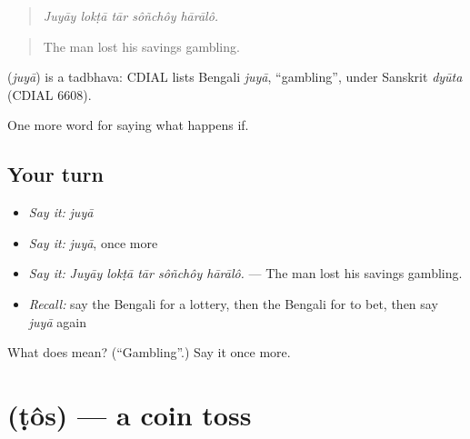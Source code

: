 \begin{quote}
    
\end{quote}

\begin{quote}
\emph{Juyāy lokṭā tār sôñchôy hārālô.}
\end{quote}

\begin{quote}
The man lost his savings gambling.
\end{quote}

\begin{cousinweb}
\textbf{} (\emph{juyā}) is a tadbhava: CDIAL lists Bengali \emph{juyā}, \textquotedblleft{}gambling\textquotedblright{}, under Sanskrit \emph{dyūta} (CDIAL 6608).
\end{cousinweb}

\begin{grammarlens}[title={What you've built}]
One more word for saying what happens if.
\end{grammarlens}

\subsection*{Your turn}
\begin{itemize}
\raggedright
  \item \emph{Say it:} \emph{juyā}
  \item \emph{Say it:} \emph{juyā}, once more
  \item \emph{Say it:} \emph{Juyāy lokṭā tār sôñchôy hārālô.} — The man lost his savings gambling.
  \item \emph{Recall:} say the Bengali for a lottery, then the Bengali for to bet, then say \emph{juyā} again
\end{itemize}

\begin{tcolorbox}[breakable,colback=teal!4,colframe=teal!35!black,title={Before you move on}]
What does  mean? (\textquotedblleft{}Gambling\textquotedblright{}.) Say it once more.
\end{tcolorbox}
\section[\texorpdfstring{\bn{টস} (ṭôs)}{টস (ṭôs)}]{ (ṭôs) — a coin toss}

\label{lesson:BN-C534-tos}



